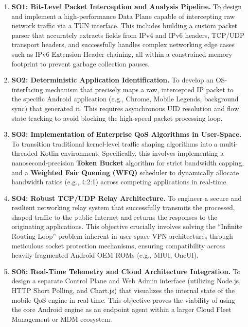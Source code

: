 \begin{enumerate}
    \item \textbf{SO1: Bit-Level Packet Interception and Analysis Pipeline.} To design and implement a high-performance Data Plane capable of intercepting raw network traffic via a TUN interface. This includes building a custom packet parser that accurately extracts fields from IPv4 and IPv6 headers, TCP/UDP transport headers, and successfully handles complex networking edge cases such as IPv6 Extension Header chaining, all within a constrained memory footprint to prevent garbage collection pauses.
    
    \item \textbf{SO2: Deterministic Application Identification.} To develop an OS-interfacing mechanism that precisely maps a raw, intercepted IP packet to the specific Android application (e.g., Chrome, Mobile Legends, background sync) that generated it. This requires asynchronous UID resolution and flow state tracking to avoid blocking the high-speed packet processing loop.
    
    \item \textbf{SO3: Implementation of Enterprise QoS Algorithms in User-Space.} To transition traditional kernel-level traffic shaping algorithms into a multi-threaded Kotlin environment. Specifically, this involves implementing a nanosecond-precision \textbf{Token Bucket} algorithm for strict bandwidth capping, and a \textbf{Weighted Fair Queuing (WFQ)} scheduler to dynamically allocate bandwidth ratios (e.g., 4:2:1) across competing applications in real-time.
    
    \item \textbf{SO4: Robust TCP/UDP Relay Architecture.} To engineer a secure and resilient networking relay system that successfully transmits the processed, shaped traffic to the public Internet and returns the responses to the originating applications. This objective crucially involves solving the ``Infinite Routing Loop'' problem inherent in user-space VPN architectures through meticulous socket protection mechanisms, ensuring compatibility across heavily fragmented Android OEM ROMs (e.g., MIUI, OneUI).
    
    \item \textbf{SO5: Real-Time Telemetry and Cloud Architecture Integration.} To design a separate Control Plane and Web Admin interface (utilizing Node.js, HTTP Short Polling, and Chart.js) that visualizes the internal state of the mobile QoS engine in real-time. This objective proves the viability of using the core Android engine as an endpoint agent within a larger Cloud Fleet Management or MDM ecosystem.
\end{enumerate}

